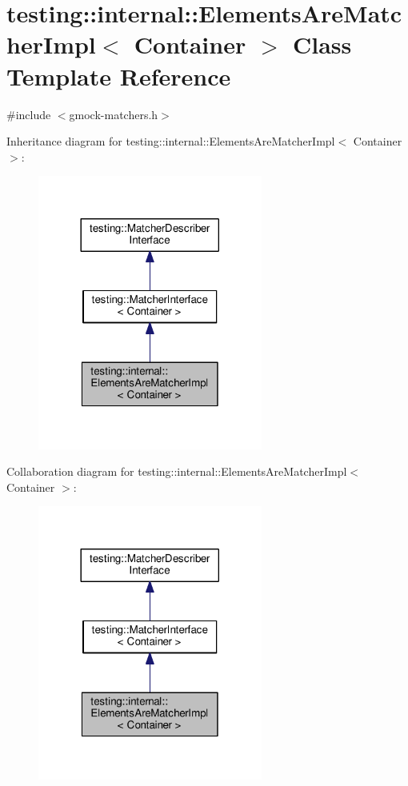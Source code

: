 \hypertarget{classtesting_1_1internal_1_1ElementsAreMatcherImpl}{}\section{testing\+:\+:internal\+:\+:Elements\+Are\+Matcher\+Impl$<$ Container $>$ Class Template Reference}
\label{classtesting_1_1internal_1_1ElementsAreMatcherImpl}


{\ttfamily \#include $<$gmock-\/matchers.\+h$>$}



Inheritance diagram for testing\+:\+:internal\+:\+:Elements\+Are\+Matcher\+Impl$<$ Container $>$\+:\nopagebreak
\begin{figure}[H]
\begin{center}
\leavevmode
\includegraphics[width=209pt]{classtesting_1_1internal_1_1ElementsAreMatcherImpl__inherit__graph}
\end{center}
\end{figure}


Collaboration diagram for testing\+:\+:internal\+:\+:Elements\+Are\+Matcher\+Impl$<$ Container $>$\+:\nopagebreak
\begin{figure}[H]
\begin{center}
\leavevmode
\includegraphics[width=209pt]{classtesting_1_1internal_1_1ElementsAreMatcherImpl__coll__graph}
\end{center}
\end{figure}
